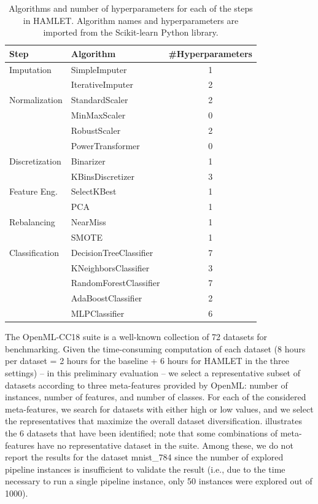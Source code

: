 \begin{table}[t]
    \footnotesize
    \caption{Algorithms and number of hyperparameters for each of the steps in HAMLET. Algorithm names and hyperparameters are imported from the Scikit-learn Python library.}
    \centering
    \begin{tabular}{llc}
        \toprule
        \textbf{Step} & \textbf{Algorithm} & \textbf{\#Hyperparameters}  \\\midrule
        Imputation        & SimpleImputer & 1 \\
                          & IterativeImputer & 2 \\
        Normalization     & StandardScaler & 2 \\
                          & MinMaxScaler & 0 \\
                          & RobustScaler & 2 \\
                          & PowerTransformer & 0 \\
        Discretization    & Binarizer & 1 \\
                          & KBinsDiscretizer & 3 \\
        Feature Eng.      & SelectKBest & 1 \\
                          & PCA & 1 \\
        Rebalancing       & NearMiss & 1 \\
                          & SMOTE & 1 \\
        Classification    & DecisionTreeClassifier & 7 \\
                          & KNeighborsClassifier & 3 \\
                          & RandomForestClassifier & 7 \\
                          & AdaBoostClassifier & 2 \\
                          & MLPClassifier & 6 \\ \bottomrule
    \end{tabular}
    \label{hamlet-tbl:search_space}
\end{table}

The OpenML-CC18 suite is a well-known collection of 72 datasets for benchmarking.
Given the time-consuming computation of each dataset (8 hours per dataset = 2 hours for the baseline + 6 hours for HAMLET in the three settings) -- in this preliminary evaluation -- we select a representative subset of datasets according to three meta-features provided by OpenML: number of instances, number of features, and number of classes.
For each of the considered meta-features, we search for datasets with either high or low values, and we select the representatives that maximize the overall dataset diversification.
 illustrates the 6 datasets that have been identified; note that some combinations of meta-features have no representative dataset in the suite.
Among these, we do not report the results for the dataset mnist\_784 since the number of explored pipeline instances is insufficient to validate the result (i.e., due to the time necessary to run a single pipeline instance, only 50 instances were explored out of 1000).

